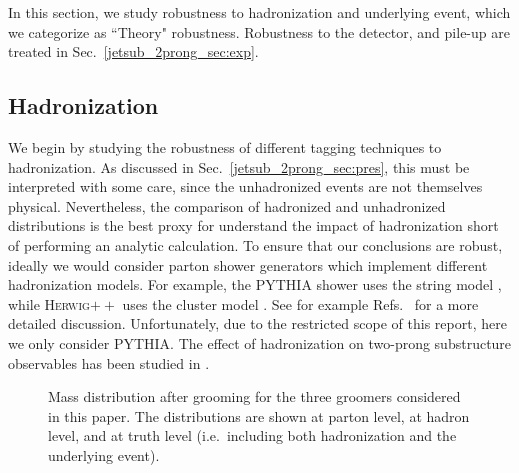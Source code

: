\documentclass[11pt]{cernrep}
\begin{document}
In this section, we study robustness to hadronization and underlying event, which we categorize as ``Theory" robustness. Robustness to the detector, and pile-up are treated in Sec.~\ref{jetsub_2prong_sec:exp}. 




\subsection{Hadronization}\label{jetsub_2prong_sec:hadr}








We begin by studying the robustness of different tagging techniques to hadronization.
%
As discussed in Sec.~\ref{jetsub_2prong_sec:pres}, this must be interpreted with some care, since the unhadronized events are not themselves physical.
%
Nevertheless, the comparison of hadronized and unhadronized distributions is the best proxy for understand the impact of hadronization short of performing an analytic calculation.
%
To ensure that our conclusions are robust, ideally we would consider parton shower generators which implement different hadronization models.
%
For example, the \textsc{PYTHIA} shower uses the string model \cite{Andersson:1983ia,Andersson:1998tv}, while \textsc{Herwig}$++$ uses the cluster model \cite{Webber:1983if,Marchesini:1987cf}.
%
See for example Refs.~\cite{Buckley:2011ms,Skands:2011pf,Skands:2012ts} for a more detailed discussion.
%
Unfortunately, due to the restricted scope of this report, here we only consider \textsc{PYTHIA}.
%
The effect of hadronization on two-prong substructure observables has been studied in \cite{Larkoski:2015kga,Salam:2016yht,Larkoski:2017iuy,Larkoski:2017cqq}.

\begin{figure}
  \caption{Mass distribution after grooming for the three groomers
    considered in this paper. The distributions are shown at parton
    level, at hadron level, and at truth level (i.e.\ including both
    hadronization and the underlying event).}\label{jetsub_2prong_fig:mass-distribution}
\end{figure}
\end{document}
